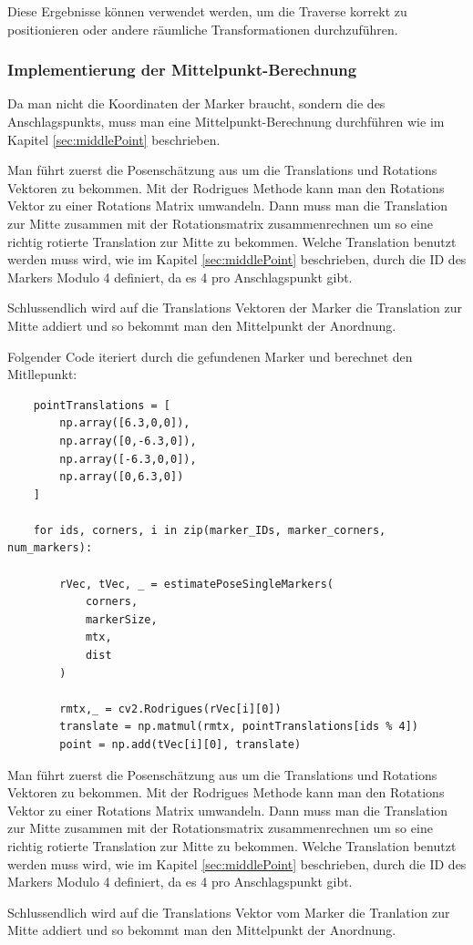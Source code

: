 Diese Ergebnisse können verwendet werden, um die Traverse korrekt zu positionieren oder andere 
räumliche Transformationen durchzuführen.


\subsubsection{Implementierung der Mittelpunkt-Berechnung}

Da man nicht die Koordinaten der Marker braucht, sondern die des Anschlagspunkts, muss man eine 
Mittelpunkt-Berechnung durchführen wie im Kapitel \ref{sec:middlePoint} beschrieben.

Man führt zuerst die Posenschätzung aus um die Translations und Rotations Vektoren zu bekommen.
Mit der Rodrigues Methode kann man den Rotations Vektor zu einer Rotations Matrix umwandeln.
Dann muss man die Translation zur Mitte zusammen mit der Rotationsmatrix zusammenrechnen um so eine richtig rotierte Translation zur Mitte zu bekommen.
Welche Translation benutzt werden muss wird, wie im Kapitel \ref{sec:middlePoint} beschrieben, durch die ID des Markers Modulo 4 definiert, da es 4 pro Anschlagspunkt gibt.

Schlussendlich wird auf die Translations Vektoren der Marker die Translation zur Mitte addiert 
und so bekommt man den Mittelpunkt der Anordnung. \clearpage


Folgender Code iteriert durch die gefundenen Marker und berechnet den Mitllepunkt: 


\begin{lstlisting}
    pointTranslations = [
        np.array([6.3,0,0]),
        np.array([0,-6.3,0]),
        np.array([-6.3,0,0]),
        np.array([0,6.3,0])
    ]

    for ids, corners, i in zip(marker_IDs, marker_corners, num_markers):
        
        rVec, tVec, _ = estimatePoseSingleMarkers(
            corners,
            markerSize, 
            mtx, 
            dist
        )
    
        rmtx,_ = cv2.Rodrigues(rVec[i][0])
        translate = np.matmul(rmtx, pointTranslations[ids % 4])
        point = np.add(tVec[i][0], translate)
\end{lstlisting}

Man führt zuerst die Posenschätzung aus um die Translations und Rotations Vektoren zu bekommen.
Mit der Rodrigues Methode kann man den Rotations Vektor zu einer Rotations Matrix umwandeln.
Dann muss man die Translation zur Mitte zusammen mit der Rotationsmatrix zusammenrechnen um so eine richtig rotierte Translation zur Mitte zu bekommen.
Welche Translation benutzt werden muss wird, wie im Kapitel \ref{sec:middlePoint} beschrieben, durch die ID des Markers Modulo 4 definiert, da es 4 pro Anschlagspunkt gibt.

Schlussendlich wird auf die Translations Vektor vom Marker die Tranlation zur Mitte addiert und so bekommt man den Mittelpunkt der Anordnung.



